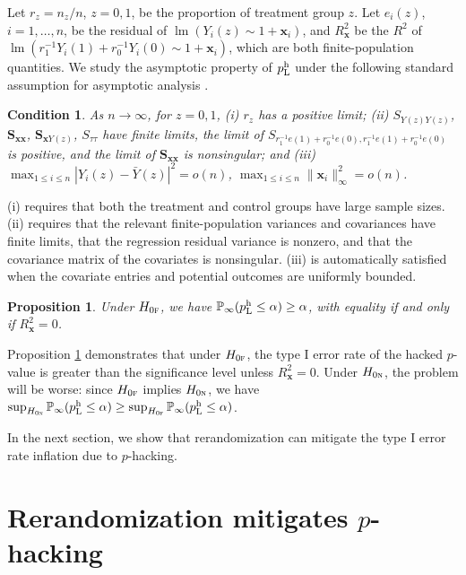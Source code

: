 \documentclass[12pt]{article}
\newtheorem{proposition}{Proposition}
\newtheorem{condition}{Condition}
\newcommand{\lmm}{\operatorname{lm}}
\newcommand{\Prob}{\mathbb{P}}
\newcommand{\bs}{\boldsymbol}
\newcommand{\hpL}{p_\textnormal{L}^{\textnormal{h}}}
\newcommand{\lx}[1]{#1}
\begin{document}
Let $r_z = n_z/n$, $z=0,1$, be the proportion of treatment group $z$. Let $e_i(z)$, $i=1,\ldots,n$, be the residual of  $\lmm(Y_i(z)\sim 1+ \bs{x}_{i})$, and $R^2_{\bs{x}}$ be the $R^2$ of $\lmm(r_1^{-1}Y_i(1)+r_0^{-1}Y_i(0)\sim 1+ \bs{x}_{i})$, which are both finite-population quantities. 
We study the asymptotic property of $\hpL$ under the following standard assumption for asymptotic analysis \citep{li2017general}.
\begin{condition}
    \label{a:crt-regularity-condition}
    As $n \rightarrow \infty$, for $z=0,1$, (i) $r_z$ has a positive limit; (ii)  $S_{Y(z)Y(z)}$,  $\bs{S}_{\bs{x}\bs{x}}$, $\bs{S}_{\bs{x} Y(z)}$, $S_{\tau\tau}$ have finite limits, the limit of $S_{r_1^{-1}e(1)+r_0^{-1}e(0),r_1^{-1}e(1)+r_0^{-1}e(0)}$ is positive, and the limit of $\bs{S}_{\bs{x}\bs{x}}$ is nonsingular; and (iii) $\max_{1 \leq i \leq n} |Y_i(z)-\bar{Y}(z)|^2 = o(n)$, $\max_{1 \leq i \leq n} \lVert \bs{x}_i\lVert_{\infty}^2 = o(n)$. 
 \end{condition} 

\lx{ (i) requires that both the treatment and
control groups have large sample sizes. \Cref{a:crt-regularity-condition} (ii)
requires that the relevant finite-population variances and covariances have
finite limits, that the regression residual variance is nonzero, and that the
covariance matrix of the covariates is nonsingular.
\Cref{a:crt-regularity-condition} (iii) is automatically satisfied when
the covariate entries and potential outcomes are uniformly bounded.}

\begin{proposition}
\label{prop:type I-error-rate-asymptotic}
Under $H_{0\textsc{f}}$, we have $\Prob_{\infty}(\hpL \leq \alpha) \geq \alpha$, with equality if and only if $R^2_{\bs{x}}=0$.
\end{proposition} 

 Proposition \ref{prop:type I-error-rate-asymptotic} demonstrates that under $H_{0\textsc{f}}$, the type I error rate of the hacked $p$-value is greater than the significance level unless $R^2_{\bs{x}}=0$. Under  $H_{0\textsc{n}}$, the problem will be worse: since $H_{0\textsc{f}}$ implies $H_{0\textsc{n}}$, we have $\sup_{H_{0\textsc{n}}}\Prob_{\infty}(\hpL \leq \alpha) \geq \sup_{H_{0\textsc{f}}}\Prob_{\infty}(\hpL \leq \alpha)$.

In the next section, we show that rerandomization can mitigate the type I error rate inflation due to $p$-hacking.

\section{Rerandomization mitigates $p$-hacking}
\end{document}
